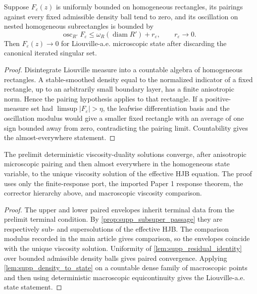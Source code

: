 \begin{lemma}
\label{lem:supp_density_to_state}
Suppose \(F_\varepsilon(z)\) is uniformly bounded on homogeneous rectangles,
its pairings against every fixed admissible density ball tend to zero, and its
oscillation on nested homogeneous subrectangles is bounded by
\[
  \operatorname{osc}_{R'}F_\varepsilon
  \le \omega_R(\operatorname{diam}R')+r_\varepsilon,
  \qquad r_\varepsilon\to0.
\]
Then \(F_\varepsilon(z)\to0\) for Liouville-a.e. microscopic state after
discarding the canonical iterated singular set.
\end{lemma}

\begin{proof}
Disintegrate Liouville measure into a countable algebra of homogeneous
rectangles.  A stable-smoothed density equal to the normalized indicator of a
fixed rectangle, up to an arbitrarily small boundary layer, has a finite
anisotropic norm.  Hence the pairing hypothesis applies to that rectangle.
If a positive-measure set had \(\limsup |F_\varepsilon|>\eta\), the leafwise
differentiation basis and the oscillation modulus would give a smaller fixed
rectangle with an average of one sign bounded away from zero, contradicting
the pairing limit.  Countability gives the almost-everywhere statement.
\end{proof}

\begin{theorem}
\label{thm:supp_detailed_hjb_closure}
The prelimit deterministic viscosity-duality solutions converge, after
anisotropic microscopic pairing and then almost everywhere in the homogeneous
state variable, to the unique viscosity solution of the effective HJB equation.
The proof uses only the finite-response port, the imported Paper 1 response
theorem, the corrector hierarchy above, and macroscopic viscosity comparison.
\end{theorem}

\begin{proof}
The upper and lower paired envelopes inherit terminal data from the prelimit
terminal condition.  By \cref{prop:supp_subsuper_passage} they are respectively
sub- and supersolutions of the effective HJB.  The comparison modulus recorded
in the main article gives comparison, so the envelopes coincide with the unique
viscosity solution.  Uniformity of \cref{lem:supp_residual_identity} over
bounded admissible density balls gives paired convergence.  Applying
\cref{lem:supp_density_to_state} on a countable dense family of macroscopic
points and then using deterministic macroscopic equicontinuity gives the
Liouville-a.e. state statement.
\end{proof}

